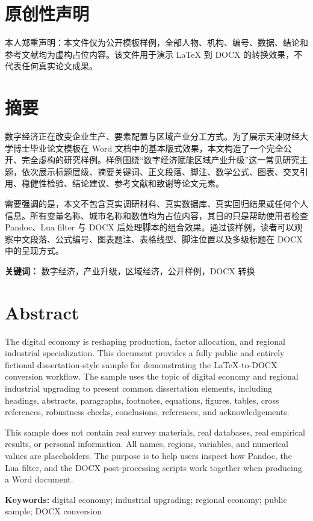 \documentclass[12pt]{ctexbook}
\begin{document}
\frontmatter
\chapter*{原创性声明}
本人郑重声明：本文件仅为公开模板样例，全部人物、机构、编号、数据、结论和参考文献均为虚构占位内容。该文件用于演示 LaTeX 到 DOCX 的转换效果，不代表任何真实论文成果。

\chapter*{摘要}
数字经济正在改变企业生产、要素配置与区域产业分工方式。为了展示天津财经大学博士毕业论文模板在 Word 文档中的基本版式效果，本文构造了一个完全公开、完全虚构的研究样例。样例围绕“数字经济赋能区域产业升级”这一常见研究主题，依次展示标题层级、摘要关键词、正文段落、脚注、数学公式、图表、交叉引用、稳健性检验、结论建议、参考文献和致谢等论文元素。

需要强调的是，本文不包含真实调研材料、真实数据库、真实回归结果或任何个人信息。所有变量名称、城市名称和数值均为占位内容，其目的只是帮助使用者检查 Pandoc、Lua filter 与 DOCX 后处理脚本的组合效果。通过该样例，读者可以观察中文段落、公式编号、图表题注、表格线型、脚注位置以及多级标题在 DOCX 中的呈现方式。

\textbf{关键词：} 数字经济，产业升级，区域经济，公开样例，DOCX 转换

\chapter*{Abstract}
The digital economy is reshaping production, factor allocation, and regional industrial specialization. This document provides a fully public and entirely fictional dissertation-style sample for demonstrating the LaTeX-to-DOCX conversion workflow. The sample uses the topic of digital economy and regional industrial upgrading to present common dissertation elements, including headings, abstracts, paragraphs, footnotes, equations, figures, tables, cross references, robustness checks, conclusions, references, and acknowledgements.

This sample does not contain real survey materials, real databases, real empirical results, or personal information. All names, regions, variables, and numerical values are placeholders. The purpose is to help users inspect how Pandoc, the Lua filter, and the DOCX post-processing scripts work together when producing a Word document.

\textbf{Keywords:} digital economy; industrial upgrading; regional economy; public sample; DOCX conversion
\end{document}
